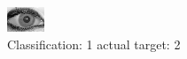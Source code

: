 \begin{figure}[h!]
\begin{center}
\includegraphics[width=0.60\columnwidth]{figures/ID2032_class_1_target_2.png}
\end{center}
\caption{ Classification: 1 actual target: 2}
\label{fig:ID2032_class_1_target_2}
\end{figure}
